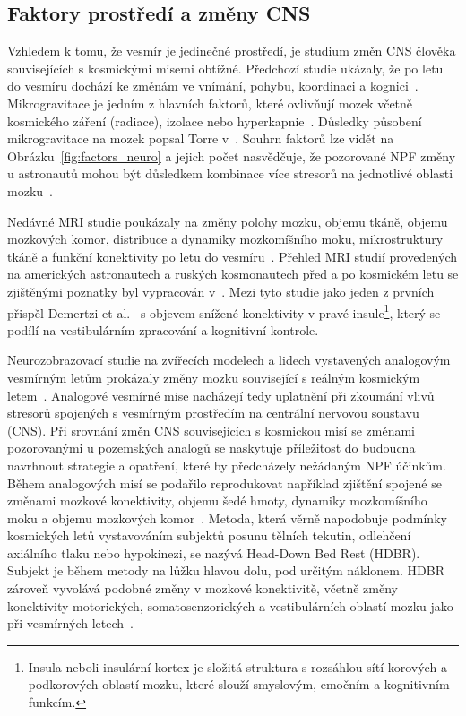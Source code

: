 \subsection{Faktory prostředí a změny CNS}
\label{subsection:faktory_prostredi_zmeny_cns}
Vzhledem k tomu, že vesmír je jedinečné prostředí, je studium změn \gls{CNS}
člověka souvisejících s kosmickými misemi obtížné. Předchozí studie ukázaly, že
po letu do vesmíru dochází ke změnám ve vnímání, pohybu, koordinaci a
kognici~\cite{Moore2019}. Mikrogravitace je jedním z hlavních faktorů, které
ovlivňují mozek včetně kosmického záření (radiace), izolace nebo
hyperkapnie~\cite{Roy2021}. Důsledky působení mikrogravitace na mozek popsal
Torre v~\cite{Torre2014}. Souhrn faktorů lze vidět na
Obrázku~\ref{fig:factors_neuro} a jejich počet nasvědčuje, že pozorované
\gls{NPF} změny u astronautů mohou být důsledkem kombinace více stresorů na
jednotlivé oblasti mozku~\cite{Roy2021}.

Nedávné MRI studie poukázaly na změny polohy mozku, objemu tkáně, objemu
mozkových komor, distribuce a dynamiky mozkomíšního moku, mikrostruktury tkáně a
funkční konektivity po letu do
vesmíru~\cite{Ombergen2019,Pechenkova2019,Roberts2017,Demertzi2015,Kramer2020}.
Přehled \gls{MRI} studií provedených na amerických astronautech a ruských
kosmonautech před a po kosmickém letu se zjištěnými poznatky byl vypracován
v~\cite{Roy2021}. Mezi tyto studie jako jeden z prvních přispěl Demertzi et
al.~\cite{Demertzi2015} s objevem snížené konektivity v pravé
insule\footnote{Insula neboli insulární kortex je složitá struktura s rozsáhlou
sítí korových a podkorových oblastí mozku, které slouží smyslovým, emočním a
kognitivním funkcím.}, který se podílí na vestibulárním zpracování a kognitivní
kontrole.

Neurozobrazovací studie na zvířecích modelech a lidech vystavených analogovým
vesmírným letům prokázaly změny mozku související s reálným kosmickým
letem~\cite{Kramer2020,Correia1998}. Analogové vesmírné mise nacházejí tedy
uplatnění při zkoumání vlivů stresorů spojených s vesmírným prostředím na
centrální nervovou soustavu (CNS). Při srovnání změn CNS souvisejících s
kosmickou misí se změnami pozorovanými u pozemských analogů se naskytuje
příležitost do budoucna navrhnout strategie a opatření, které by předcházely
nežádaným NPF účinkům. Během analogových misí se podařilo reprodukovat například
zjištění spojené se změnami mozkové konektivity, objemu šedé hmoty, dynamiky
mozkomíšního moku a objemu mozkových komor~\cite{Roy2021}. Metoda, která věrně
napodobuje podmínky kosmických letů vystavováním subjektů posunu tělních
tekutin, odlehčení axiálního tlaku nebo hypokinezi, se nazývá Head-Down Bed Rest
(\gls{HDBR}). Subjekt je během metody na lůžku hlavou dolu, pod určitým
náklonem. HDBR zároveň vyvolává podobné změny v mozkové konektivitě, včetně
změny konektivity motorických, somatosenzorických a vestibulárních oblastí mozku
jako při vesmírných letech~\cite{Koppelmans2016, Koppelmans2017}.


